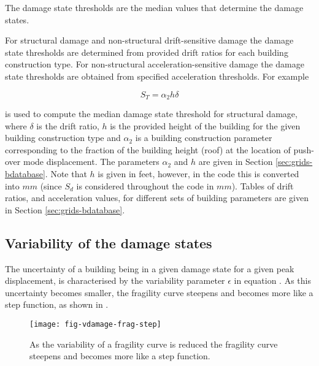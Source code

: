 The damage state thresholds are the median values that determine the
damage states.

For structural damage and non-structural drift-sensitive damage
the damage state thresholds are determined from provided drift
ratios for each building construction type. For non-structural
acceleration-sensitive damage the damage state thresholds are
obtained from specified acceleration thresholds. For example

\begin{equation}
\label{eq:damage-dstate}
 S_T = \alpha_2 h\delta
\end{equation}

is used to compute the median damage state threshold for
structural damage, where $\delta$ is the drift ratio, $h$ is the
provided height of the building for the given building
construction type and $\alpha_2$ is a building construction
parameter corresponding to the fraction of the building height
(roof) at the location of push-over mode displacement. The
parameters $\alpha_2$ and $h$ are given in Section
\ref{sec:grids-bdatabase}. Note that $h$ is given in
feet, however, in the code this is converted into $mm$ (since
$S_d$ is considered throughout the code in $mm$). Tables of drift
ratios, and acceleration values, for different sets of building
parameters are given in Section \ref{sec:grids-bdatabase}.


\subsection{Variability of the damage states}

The uncertainty of a building being in a given damage state for a
given peak displacement, is characterised
by the variability parameter $\epsilon$ in equation
. As this uncertainty becomes smaller, the
fragility curve steepens and becomes more
like a step function, as shown in .

\begin{figure}[htp]
\centering {}
\texttt{[image: fig-vdamage-frag-step]}
\caption{As the variability of a fragility curve is reduced the
  fragility curve steepens and becomes more like a step function.}
\label{fig:vdamage-frag-var}
\end{figure}


